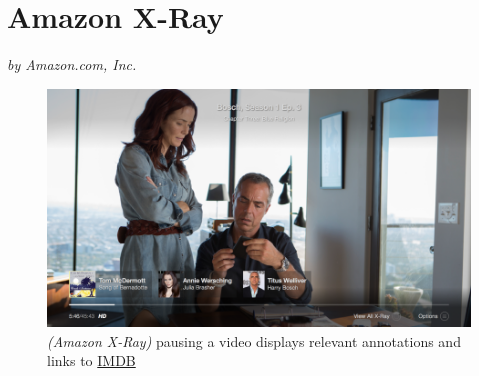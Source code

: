 
%






\section{Amazon X-Ray}
\label{sec:priorwork:amazon-x-ray}
\textit{by Amazon.com, Inc.}

\begin{figure}[ht]
	\includegraphics[width=\textwidth]{gfx/amazon-x-ray/pause-quick-view-930x523.png}
	\caption{\textit{(Amazon X-Ray)} pausing a video displays relevant annotations and links to \href{http://www.imdb.com}{IMDB}} 
	\label{fig:amazon-x-ray:paused-video-annotations}
\end{figure} 

